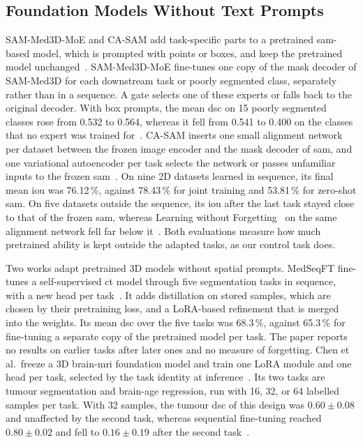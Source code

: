 \subsection{Foundation Models Without Text Prompts}
\label{subsec:cl-medseg-fm}

SAM-Med3D-MoE and CA-SAM add task-specific parts to a pretrained \gls{sam}-based model, which is prompted with points or boxes, and keep the pretrained model unchanged~\cite{wang2024sammed3dmoe,wang2025casam}.
SAM-Med3D-MoE fine-tunes one copy of the mask decoder of SAM-Med3D for each downstream task or poorly segmented class, separately rather than in a sequence.
A gate selects one of these experts or falls back to the original decoder.
With box prompts, the mean \gls{dsc} on 15 poorly segmented classes rose from 0.532 to 0.564, whereas it fell from 0.541 to 0.400 on the classes that no expert was trained for~\cite[Table~1]{wang2024sammed3dmoe}.
CA-SAM inserts one small alignment network per dataset between the frozen image encoder and the mask decoder of \gls{sam}, and one variational autoencoder per task selects the network or passes unfamiliar inputs to the frozen \gls{sam}~\cite{wang2025casam}.
On nine 2D datasets learned in sequence, its final mean \gls{iou} was 76.12\,\%, against 78.43\,\% for joint training and 53.81\,\% for zero-shot \gls{sam}.
On five datasets outside the sequence, its \gls{iou} after the last task stayed close to that of the frozen \gls{sam}, whereas Learning without Forgetting~\cite{li2017learningforgetting} on the same alignment network fell far below it~\cite[Table~2]{wang2025casam}.
Both evaluations measure how much pretrained ability is kept outside the adapted tasks, as our control task does.

Two works adapt pretrained 3D models without spatial prompts.
MedSeqFT fine-tunes a self-supervised \gls{ct} model through five segmentation tasks in sequence, with a new head per task~\cite{ye2025medseqft}.
It adds distillation on stored samples, which are chosen by their pretraining loss, and a LoRA-based refinement that is merged into the weights.
Its mean \gls{dsc} over the five tasks was 68.3\,\%, against 65.3\,\% for fine-tuning a separate copy of the pretrained model per task.
The paper reports no results on earlier tasks after later ones and no measure of forgetting.
Chen et al.\ freeze a 3D brain-\gls{mri} foundation model and train one LoRA module and one head per task, selected by the task identity at inference~\cite{chen2026fewshotcontinuallearning3d}.
Its two tasks are tumour segmentation and brain-age regression, run with 16, 32, or 64 labelled samples per task.
With 32 samples, the tumour \gls{dsc} of this design was $0.60 \pm 0.08$ and unaffected by the second task, whereas sequential fine-tuning reached $0.80 \pm 0.02$ and fell to $0.16 \pm 0.19$ after the second task~\cite[Table~1]{chen2026fewshotcontinuallearning3d}.

